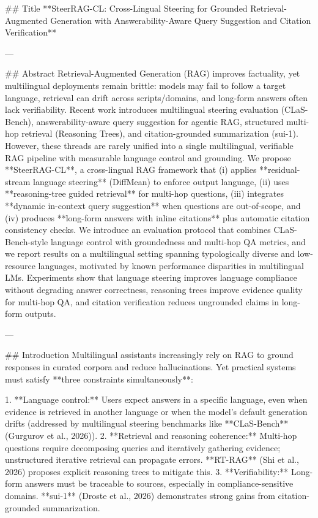 ## Title
**SteerRAG-CL: Cross-Lingual Steering for Grounded Retrieval-Augmented Generation with Answerability-Aware Query Suggestion and Citation Verification**

---

## Abstract
Retrieval-Augmented Generation (RAG) improves factuality, yet multilingual deployments remain brittle: models may fail to follow a target language, retrieval can drift across scripts/domains, and long-form answers often lack verifiability. Recent work introduces multilingual steering evaluation (CLaS-Bench), answerability-aware query suggestion for agentic RAG, structured multi-hop retrieval (Reasoning Trees), and citation-grounded summarization (sui-1). However, these threads are rarely unified into a single multilingual, verifiable RAG pipeline with measurable language control and grounding. We propose **SteerRAG-CL**, a cross-lingual RAG framework that (i) applies **residual-stream language steering** (DiffMean) to enforce output language, (ii) uses **reasoning-tree guided retrieval** for multi-hop questions, (iii) integrates **dynamic in-context query suggestion** when questions are out-of-scope, and (iv) produces **long-form answers with inline citations** plus automatic citation consistency checks. We introduce an evaluation protocol that combines CLaS-Bench-style language control with groundedness and multi-hop QA metrics, and we report results on a multilingual setting spanning typologically diverse and low-resource languages, motivated by known performance disparities in multilingual LMs. Experiments show that language steering improves language compliance without degrading answer correctness, reasoning trees improve evidence quality for multi-hop QA, and citation verification reduces ungrounded claims in long-form outputs.

---

## Introduction
Multilingual assistants increasingly rely on RAG to ground responses in curated corpora and reduce hallucinations. Yet practical systems must satisfy **three constraints simultaneously**:

1. **Language control:** Users expect answers in a specific language, even when evidence is retrieved in another language or when the model’s default generation drifts (addressed by multilingual steering benchmarks like **CLaS-Bench** (Gurgurov et al., 2026)).
2. **Retrieval and reasoning coherence:** Multi-hop questions require decomposing queries and iteratively gathering evidence; unstructured iterative retrieval can propagate errors. **RT-RAG** (Shi et al., 2026) proposes explicit reasoning trees to mitigate this.
3. **Verifiability:** Long-form answers must be traceable to sources, especially in compliance-sensitive domains. **sui-1** (Droste et al., 2026) demonstrates strong gains from citation-grounded summarization.

